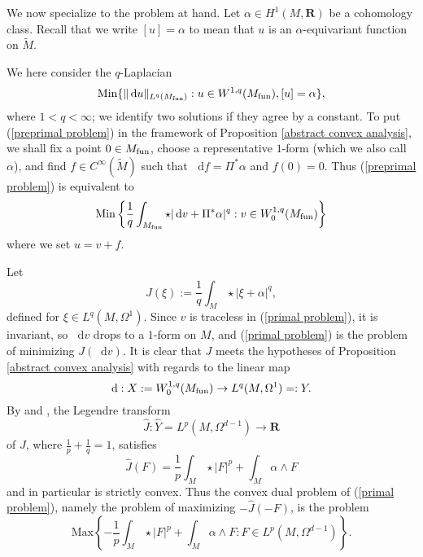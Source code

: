 \documentclass[reqno,11pt]{amsart}
\newcommand{\RR}{\mathbf{R}}
\newcommand*\dif{\mathop{}\!\mathrm{d}}
\newcommand{\Min}{\mathrm{Min}}
\newcommand{\Max}{\mathrm{Max}}
\theoremstyle{definition}
\numberwithin{equation}{section}
\begin{document}
We now specialize to the problem at hand.
Let $\alpha \in H^1(M, \RR)$ be a cohomology class.
Recall that we write $[u] = \alpha$ to mean that $u$ is an $\alpha$-equivariant function on $\tilde M$.

We here consider the $q$-Laplacian
\begin{equation}\label{preprimal problem}
	\Min\{\|\dif u\|_{L^q(M_{\rm fun})}: u \in W^{1, q}(M_{\rm fun}), [u] = \alpha\},
\end{equation}
where $1 < q < \infty$; we identify two solutions if they agree by a constant.
To put (\ref{preprimal problem}) in the framework of Proposition \ref{abstract convex analysis}, we shall fix a point $0 \in M_{\rm fun}$, choose a representative $1$-form (which we also call $\alpha$), and find $f \in C^\infty(\tilde M)$ such that $\dif f = \Pi^*\alpha$ and $f(0) = 0$.
Thus (\ref{preprimal problem}) is equivalent to
\begin{equation}\label{primal problem}
	\Min\left\{\frac{1}{q} \int_{M_{\rm fun}} \star|\dif v + \Pi^* \alpha|^q: v \in W^{1, q}_0(M_{\rm fun})\right\}
\end{equation}
where we set $u = v + f$.

Let
$$J(\xi) := \frac{1}{q} \int_M \star|\xi + \alpha|^q,$$
defined for $\xi \in L^q(M, \Omega^1)$.
Since $v$ is traceless in (\ref{primal problem}), it is invariant, so $\dif v$ drops to a $1$-form on $M$, and (\ref{primal problem}) is the problem of minimizing $J(\dif v)$.
It is clear that $J$ meets the hypotheses of Proposition \ref{abstract convex analysis} with regards to the linear map
\begin{equation}\label{derivative on traceless}
\dif: X := W^{1, q}_0(M_{\rm fun}) \to L^q(M, \Omega^1) =: Y.
\end{equation}
By \cite[Chapter I, (4.9)]{Ekeland99} and \cite[Chapter I, Remark 4.1]{Ekeland99}, the Legendre transform
$$\hat J: \hat Y = L^p(M, \Omega^{d - 1}) \to \RR$$
of $J$, where $\frac{1}{p} + \frac{1}{q} = 1$, satisfies
\begin{equation}\label{Legendre transform}
\hat J(F) = \frac{1}{p} \int_M \star |F|^p + \int_M \alpha \wedge F
\end{equation}
and in particular is strictly convex.
Thus the convex dual problem of (\ref{primal problem}), namely the problem of maximizing $-\hat J(-F)$, is the problem
\begin{equation}\label{predual problem}
\Max\left\{- \frac{1}{p} \int_M \star |F|^p + \int_M \alpha \wedge F: F \in L^p(M, \Omega^{d - 1})\right\}.
\end{equation}
\end{document}
